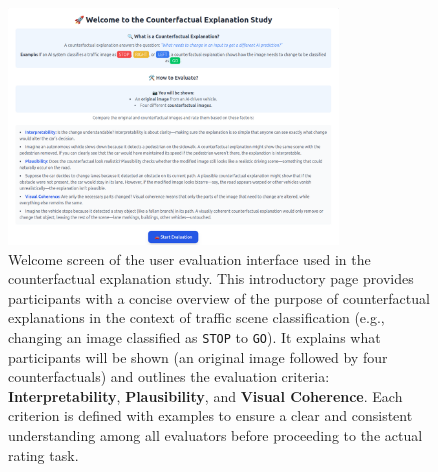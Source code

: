 \begin{figure}
    \centering
    \includegraphics[width=0.78\textwidth]{img/web_app_screenshots/form_ui_info.png}
    \caption{Welcome screen of the user evaluation interface used in the counterfactual explanation study. This introductory page provides participants with a concise overview of the purpose of counterfactual explanations in the context of traffic scene classification (e.g., changing an image classified as \texttt{STOP} to \texttt{GO}). It explains what participants will be shown (an original image followed by four counterfactuals) and outlines the evaluation criteria: \textbf{Interpretability}, \textbf{Plausibility}, and \textbf{Visual Coherence}. Each criterion is defined with examples to ensure a clear and consistent understanding among all evaluators before proceeding to the actual rating task.}
    \label{fig:app:form_ui}
\end{figure}





